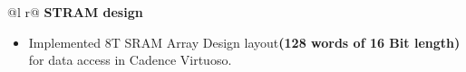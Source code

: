 \documentclass[a4paper,10pt]{article}
\begin{document}
\begin{tabularx}{\linewidth}{ @{}l r@{} }
    \textbf{STRAM design} \\[2.75pt]
    {
        \begin{minipage}[t]{\linewidth}
            \begin{itemize}[nosep,after=\strut, leftmargin=2em, itemsep=3pt]
                \item Implemented 8T SRAM Array Design layout\textbf{(128 words of 16 Bit length)} for data access in Cadence Virtuoso. 
            \end{itemize}
        \end{minipage}
    }  
\end{tabularx}

\end{document}
